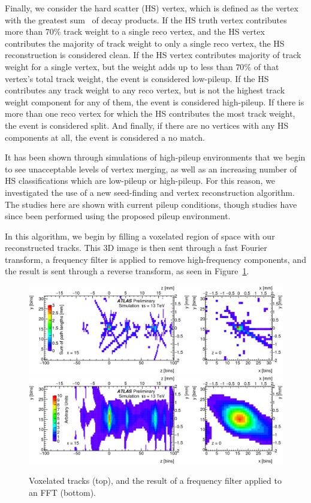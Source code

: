 Finally, we consider the hard scatter (HS) vertex, which is defined as the vertex with the greatest sum \pt\ of decay products. If the HS truth vertex contributes more than $70\%$ track weight to a single reco vertex, and the HS vertex contributes the majority of track weight to only a single reco vertex, the HS reconstruction is considered clean. If the HS vertex contributes majority of track weight for a single vertex, but the weight adds up to less than $70\%$ of that vertex's total track weight, the event is considered low-pileup. If the HS contributes any track weight to any reco vertex, but is not the highest track weight component for any of them, the event is considered high-pileup. If there is more than one reco vertex for which the HS contributes the most track weight, the event is considered split. And finally, if there are no vertices with any HS components at all, the event is considered a no match.

It has been shown through simulations of high-pileup environments that we begin to see unacceptable levels of vertex merging, as well as an increasing number of HS classifications which are low-pileup or high-pileup. For this reason, we investigated the use of a new seed-finding and vertex reconstruction algorithm. The studies here are shown with current pileup conditions, though studies have since been performed using the proposed pileup environment.

In this algorithm, we begin by filling a voxelated region of space with our reconstructed tracks. This 3D image is then sent through a fast Fourier transform, a frequency filter is applied to remove high-frequency components, and the result is sent through a reverse transform, as seen in Figure~\ref{fig:FFT}.

\begin{figure}[htbp]
    \centering
    \includegraphics[width=\linewidth]{Images/Other/vertex_FFT_1.png}
    \includegraphics[width=\linewidth]{Images/Other/vertex_FFT_2.png}
    \caption{Voxelated tracks (top), and the result of a frequency filter applied to an FFT (bottom).}
    \label{fig:FFT}
\end{figure}

